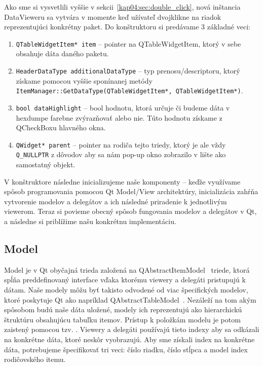 Ako sme si vysvetlili vyššie v sekcii~\ref{kap04:sec:double_click}, nová inštancia DataVieweru sa vytvára v momente keď užívateľ dvojklikne na riadok reprezentujúci konkrétny paket. Do konštruktoru si predávame 3 základné veci:
\begin{enumerate}
\item \texttt{QTableWidgetItem* item} -- pointer na QTableWidgetItem, ktorý v sebe obsahuje dáta daného paketu.

\item \texttt{HeaderDataType additionalDataType} -- typ prenosu/descriptoru, ktorý získame pomocou vyššie sponínanej metódy \texttt{ItemManager::GetDataType(QTableWidgetItem*, \newline QTableWidgetItem*)}.

\item \texttt{bool dataHighlight} -- bool hodnotu, ktorá určuje či budeme dáta v hexdumpe farebne zvýrazňovať alebo nie. Túto hodnotu získame z QCheckBoxu hlavného okna.

\item \texttt{QWidget* parent} -- pointer na rodiča tejto triedy, ktorý je ale vždy \texttt{Q\_NULLPTR} z dôvodov aby sa nám pop-up okno zobrazilo v lište ako samostatný objekt.
\end{enumerate}

V konštruktore následne inicializujeme naše komponenty -- keďže využívame spôsob programovania pomocou Qt Model/View architektúry, inicializácia zahŕňa vytvorenie modelov a delegátov a ich následné priradenie k jednotlivým viewerom. Teraz si povieme obecný spôsob fungovania modelov a delegátov v Qt, a následne si priblížime našu konkrétnu implementáciu.


\subsection{Model}
Model je v Qt obyčajná trieda založená na QAbstractItemModel~\cite{qabstractitemmodel} triede, ktorá spĺňa preddefinovaný interface vďaka ktorému viewery a delegáti pristupujú k dátam. Naše modely môžu byť takisto odvodené od viac špecifických modelov, ktoré poskytuje Qt ako napríklad QAbstractTableModel~\cite{qabstracttablemodel}. Nezáleží na tom akým spôsobom budú naše dáta uložené, modely ich reprezentujú ako hierarchickú štruktúru obsahujúcu tabuľku itemov. Prístup k položkám modelu je potom zaistený pomocou tzv. . Viewery a delegáti používajú tieto indexy aby sa odkázali na konkrétne dáta, ktoré neskôr vyobrazujú. Aby sme získali index na konkrétne dáta, potrebujeme špecifikovať tri veci: číslo riadku, číslo stĺpca a model index rodičovského itemu.
